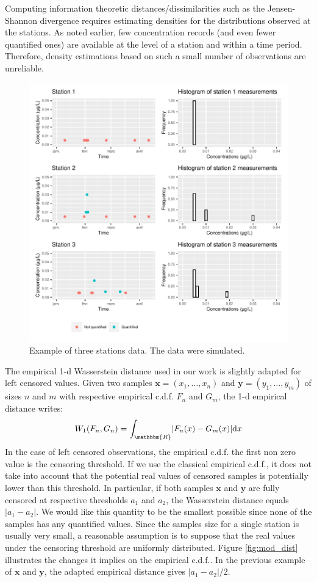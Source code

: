 \begin{appendices}
Computing information theoretic distances/dissimilarities such as the Jensen-Shannon divergence requires estimating densities for the distributions observed at the stations. As noted earlier, few concentration records (and even fewer quantified ones) are available at the level of a station and within a time period. Therefore, density estimations based on such a small number of observations are unreliable.

\begin{figure}[H]
    \centering
    \includegraphics{figs/App/Simu_ex.pdf}
    \caption{Example of three stations data. The data were simulated.}
    \label{fig:ex_dist}
\end{figure}

The empirical 1-d Wasserstein distance used in our work is slightly adapted for left censored values. Given two samples $\bm{x}=(x_1,\dots,x_n)$ and $\bm{y}=(y_1,\dots,y_m)$ of sizes $n$ and $m$ with respective empirical c.d.f. $F_n$ and $G_m$, the 1-d empirical distance writes:
$$W_1(F_n,G_n) = \int_{\mathbbm{R}}\lvert F_n(x)-G_m(x) \rvert\mathrm{d}x$$
In the case of left censored observations, the empirical c.d.f. the first non zero value is the censoring threshold. If we use the classical empirical c.d.f., it does not take into account that the potential real values of censored samples is potentially lower than this threshold. In particular, if both samples $\bm{x}$ and $\bm{y}$ are fully censored at respective thresholds $a_1$ and $a_2$, the Wasserstein distance equals $\lvert a_1-a_2 \rvert$. We would like this quantity to be the smallest possible since none of the samples has any quantified values. Since the samples size for a single station is usually very small, a reasonable assumption is to suppose that the real values under the censoring threshold are uniformly distributed. Figure \ref{fig:mod_dist} illustrates the changes it implies on the empirical c.d.f.. In the previous example of $\bm{x}$ and $\bm{y}$, the adapted empirical distance gives $\lvert a_1-a_2\rvert/2$.    


\end{appendices}
